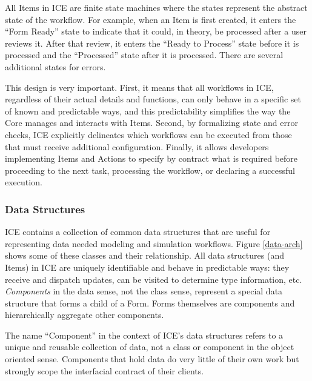 All Items in ICE are finite state machines where the states represent
the abstract state of the workflow. For example, when an Item is first
created, it enters the ``Form Ready'' state to indicate that it could,
in theory, be processed after a user reviews it. After that review, it
enters the ``Ready to Process'' state before it is processed and 
the ``Processed'' state after it is processed. There are several additional 
states for errors.

This design is very important. First, it means that all workflows in
ICE, regardless of their actual details and functions, can only behave in
a specific set of known and predictable ways, and this predictability 
simplifies the way the Core manages and interacts with Items. Second, by
formalizing state and error checks, ICE explicitly delineates which workflows 
can be executed from those that must receive additional configuration. 
Finally, it allows developers implementing Items and
Actions to specify by contract what is required before proceeding to the
next task, processing the workflow, or declaring a successful execution.

\subsubsection{Data Structures}

ICE contains a collection of common data structures that are useful for representing data needed modeling and simulation workflows. Figure \ref{data-arch} shows some of these classes and their relationship. All data structures (and Items) in ICE are uniquely identifiable and behave in predictable ways: they receive and dispatch updates, can be visited to determine type information, etc. \textit{Components} in the data sense, not the class sense, represent a special data structure that forms a child of a Form. Forms themselves are components and hierarchically aggregate other components.

The name ``Component'' in the context of ICE's data structures refers to a unique and reusable collection of data, not a class or component in the object oriented sense. Components that hold data do very little of their own work but strongly scope the interfacial contract of their clients.

